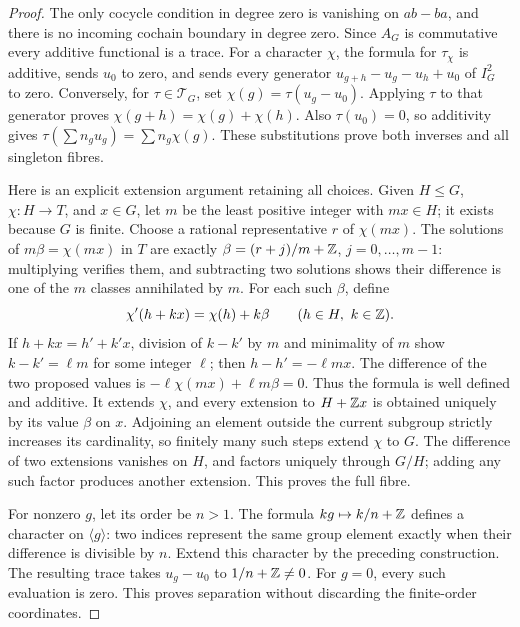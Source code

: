 \begin{proof}
The only cocycle condition in degree zero is vanishing on
\(ab-ba\), and there is no incoming cochain boundary in degree zero.
Since \(A_G\) is commutative every additive functional is a trace.
For a character \(\chi\), the formula for \(\tau_\chi\) is
additive, sends \(u_0\) to zero, and sends every generator
\(u_{g+h}-u_g-u_h+u_0\) of \(I_G^2\) to zero.
Conversely, for \(\tau\in\mathcal T_G\), set
\(\chi(g)=\tau(u_g-u_0)\). Applying \(\tau\) to that generator
proves \(\chi(g+h)=\chi(g)+\chi(h)\). Also \(\tau(u_0)=0\),
so additivity gives \(\tau(\sum n_gu_g)=\sum n_g\chi(g)\).
These substitutions prove both inverses and all singleton fibres.

Here is an explicit extension argument retaining all choices. Given
\(H\leq G\), \(\chi:H\to T\), and \(x\in G\), let \(m\)
be the least positive integer with \(mx\in H\); it exists because
\(G\) is finite. Choose a rational representative \(r\) of
\(\chi(mx)\). The solutions of \(m\beta=\chi(mx)\) in \(T\)
are exactly
\(\beta=(r+j)/m+\mathbb Z\), \(j=0,\ldots,m-1\): multiplying
verifies them, and subtracting two solutions shows their difference
is one of the \(m\) classes annihilated by \(m\).
For each such \(\beta\), define
\[
 \chi'(h+kx)=\chi(h)+k\beta\qquad(h\in H,\ k\in\Z).
\]
If \(h+kx=h'+k'x\), division of \(k-k'\) by \(m\) and
minimality of \(m\) show \(k-k'=\ell m\) for some integer
\(\ell\); then \(h-h'=-\ell mx\). The difference of the
two proposed values is \(-\ell\chi(mx)+\ell m\beta=0\).
Thus the formula is well defined and additive. It extends \(\chi\),
and every extension to \(H+\mathbb Z x\) is obtained uniquely by its
value \(\beta\) on \(x\). Adjoining an element outside the current
subgroup strictly increases its cardinality, so finitely many such
steps extend \(\chi\) to \(G\). The difference of two extensions
vanishes on \(H\), and factors uniquely through \(G/H\); adding
any such factor produces another extension. This proves the full fibre.

For nonzero \(g\), let its order be \(n>1\). The formula
\(kg\mapsto k/n+\mathbb Z\) defines a character on \(\langle g\rangle\):
two indices represent the same group element exactly when their
difference is divisible by \(n\). Extend this character by the
preceding construction. The resulting trace takes
\(u_g-u_0\) to \(1/n+\mathbb Z\ne0\). For \(g=0\), every such
evaluation is zero. This proves separation without discarding
the finite-order coordinates.
\end{proof}

